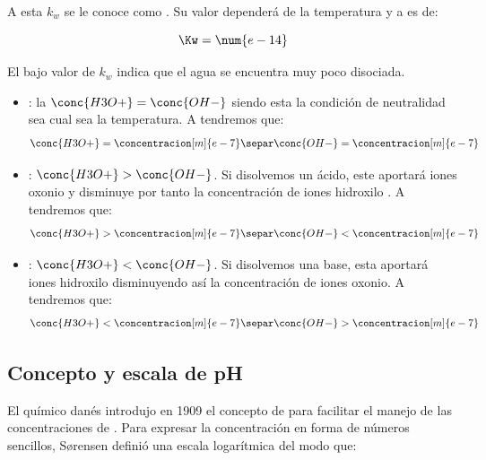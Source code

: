     A esta \(k_w\) se le conoce como .
    Su valor dependerá de la temperatura y a  es de:

    \begin{equation}
        \Kw = \num{e-14}
        \label{eq:valor-de-k-agua}
    \end{equation}

    El bajo valor de \(k_w\) indica que el agua se encuentra muy poco disociada.

    \begin{itemize}
        \item {}: la \(\conc{H3O+} = \conc{OH-}\) siendo esta la condición de neutralidad sea cual sea la temperatura.
        A  tendremos que:
        \begin{gather*}
            \conc{H3O+} = \concentracion[m]{e-7}\separ
            \conc{OH-} = \concentracion[m]{e-7}
        \end{gather*}
        \item {}: \(\conc{H3O+} > \conc{OH-}\).
        Si disolvemos un ácido, este aportará iones oxonio  y disminuye por tanto la concentración de iones hidroxilo . A  tendremos que:
        \begin{gather*}
            \conc{H3O+} > \concentracion[m]{e-7}\separ
            \conc{OH-} < \concentracion[m]{e-7}
        \end{gather*}
        \item {}: \(\conc{H3O+} < \conc{OH-}\).
        Si disolvemos una base, esta aportará iones hidroxilo disminuyendo así la concentración de iones oxonio.
        A  tendremos que:
        \begin{gather*}
            \conc{H3O+} < \concentracion[m]{e-7}\separ
            \conc{OH-} > \concentracion[m]{e-7}
        \end{gather*}
    \end{itemize}

    \subsection{Concepto y escala de pH}\label{subsec:concepto-y-escala-de-ph}

    El químico danés  introdujo en \num{1909} el concepto de  para facilitar el manejo de las concentraciones de .
    Para expresar la concentración en forma de números sencillos, S\o{}rensen definió una escala logarítmica del modo que:


